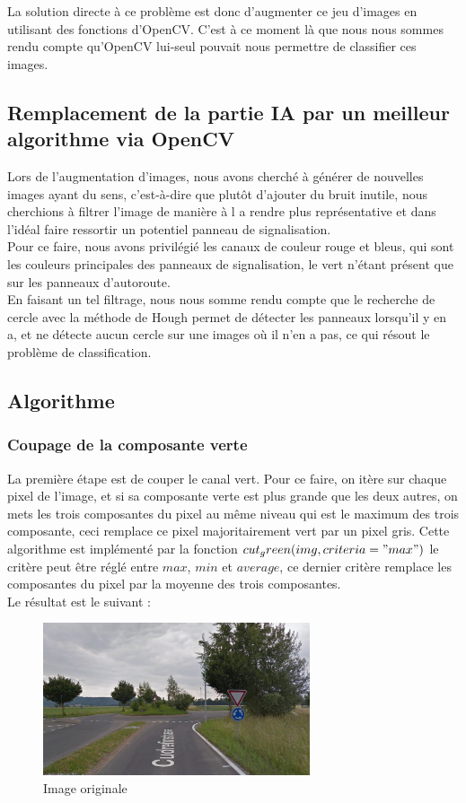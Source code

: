 \documentclass[a4paper,10pt,openany,oneside]{report}
\begin{document}
La solution directe à ce problème est donc d'augmenter ce jeu d'images en utilisant des fonctions d'OpenCV. C'est à ce moment là que nous nous sommes rendu compte qu'OpenCV lui-seul pouvait nous permettre de classifier ces images.

\subsection{Remplacement de la partie IA par un meilleur algorithme via OpenCV}
Lors de l'augmentation d'images, nous avons cherché à générer de nouvelles images ayant du sens, c'est-à-dire que plutôt d'ajouter du bruit inutile, nous cherchions à filtrer l'image de manière à l a rendre plus représentative et dans l'idéal faire ressortir un potentiel panneau de signalisation.\\

Pour ce faire, nous avons privilégié les canaux de couleur rouge et bleus, qui sont les couleurs principales des panneaux de signalisation, le vert n'étant présent que sur les panneaux d'autoroute.\\

En faisant un tel filtrage, nous nous somme rendu compte que le recherche de cercle avec la méthode de Hough permet de détecter les panneaux lorsqu'il y en a, et ne détecte aucun cercle sur une images où il n'en a pas, ce qui résout le problème de classification.

\subsection{Algorithme}
\subsubsection{Coupage de la composante verte}
La première étape est de couper le canal vert. Pour ce faire, on itère sur chaque pixel de l'image, et si sa composante verte est plus grande que les deux autres, on mets les trois composantes du pixel au même niveau qui est le maximum des trois composante, ceci remplace ce pixel majoritairement vert par un pixel gris. Cette algorithme est implémenté par la fonction $cut_green(img, criteria="max")$ le critère peut être réglé entre $max$, $min$ et $average$, ce dernier critère remplace les composantes du pixel par la moyenne des trois composantes.\\

Le résultat est le suivant :
\begin{figure}[!h]
\centering
\includegraphics[width=0.7\textwidth]{../img/80-original.png}
\caption{Image originale}
\end{figure}
\end{document}
